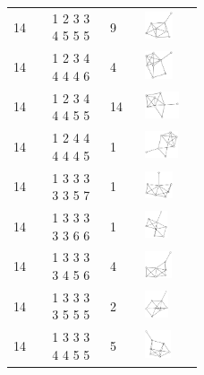 \begin{footnotesize}
\begin{longtable}{m{0.07\linewidth} m{0.15\linewidth} m{0.05\linewidth} m{0.15\linewidth}}
14 & 1 2 3 3 4 5 5 5 & 9 & \includegraphics[height=0.8cm]{15-universal-graphs/img/degree-sequences-example-graphs/graph-4-8-70}\\
14 & 1 2 3 4 4 4 4 6 & 4 & \includegraphics[height=0.8cm]{15-universal-graphs/img/degree-sequences-example-graphs/graph-4-8-71}\\
14 & 1 2 3 4 4 4 5 5 & 14 & \includegraphics[height=0.8cm]{15-universal-graphs/img/degree-sequences-example-graphs/graph-4-8-72}\\
14 & 1 2 4 4 4 4 4 5 & 1 & \includegraphics[height=0.8cm]{15-universal-graphs/img/degree-sequences-example-graphs/graph-4-8-73}\\
14 & 1 3 3 3 3 3 5 7 & 1 & \includegraphics[height=0.8cm]{15-universal-graphs/img/degree-sequences-example-graphs/graph-4-8-74}\\
14 & 1 3 3 3 3 3 6 6 & 1 & \includegraphics[height=0.8cm]{15-universal-graphs/img/degree-sequences-example-graphs/graph-4-8-75}\\
14 & 1 3 3 3 3 4 5 6 & 4 & \includegraphics[height=0.8cm]{15-universal-graphs/img/degree-sequences-example-graphs/graph-4-8-76}\\
14 & 1 3 3 3 3 5 5 5 & 2 & \includegraphics[height=0.8cm]{15-universal-graphs/img/degree-sequences-example-graphs/graph-4-8-77}\\
14 & 1 3 3 3 4 4 5 5 & 5 & \includegraphics[height=0.8cm]{15-universal-graphs/img/degree-sequences-example-graphs/graph-4-8-78}\\

\end{longtable}
\end{footnotesize}
